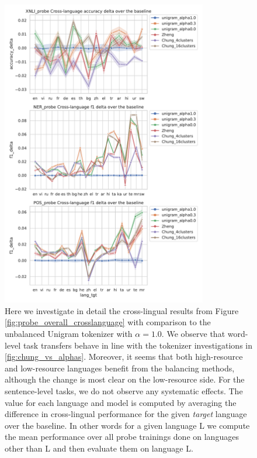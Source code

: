 \begin{figure}
    \centering
    \includegraphics[width=0.8\textwidth]{figures/probe_detailed_crosslanguage_over_baseline_lang_tgt.pdf}
    \caption{Here we investigate in detail the cross-lingual results from Figure \ref{fig:probe_overall_crosslanguage} with comparison to the unbalanced Unigram tokenizer with $\alpha=1.0$. We observe that word-level task transfers behave in line with the tokenizer investigations in \ref{fig:chung_vs_alphas}. Moreover, it seems that both high-resource and low-resource languages benefit from the balancing methods, although the change is most clear on the low-resource side. For the sentence-level tasks, we do not observe any systematic effects. The value for each language and model is computed by averaging the difference in cross-lingual performance for the given \textit{target} language over the baseline. In other words for a given language L we compute the mean performance over all probe trainings done on languages other than L and then evaluate them on language L.}
    \label{fig:probe_overall_crosslanguage_over_baseline}
\end{figure}

